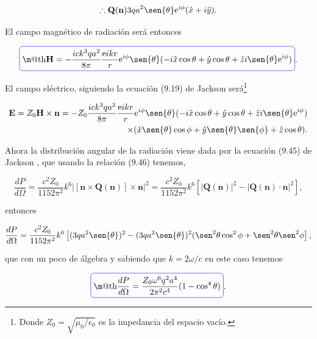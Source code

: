 \documentclass[a4paper,11pt]{article}
\makeatletter
\numberwithin{equation}{section}
\newcommand*{\boxcolor}{blue}
\renewcommand{\boxed}[1]{\textcolor{\boxcolor}{%
\tikz[baseline={([yshift=-1ex]current bounding box.center)}] \node [rectangle, minimum width=1ex,rounded corners,draw] {\normalcolor\m@th$\displaystyle#1$};}}
\newcommand{\euler}{\mathrm{e}}
\makeatother
\begin{document}
\begin{equation}
 \therefore \mathbf{Q}(\mathbf{n}) 3qa^2\sen{\theta} \euler^{i\phi}(\hat{x} + 
 i\hat{y}).
\end{equation}

El campo magnético de radiación será entonces 

\begin{equation}
 \boxed{\mathbf{H} = - \frac{ick^3qa^2}{8\pi}\frac{\euler{ikr}}{r} \euler^{i\phi} 
 \sen{\theta}(-i \hat{x} \cos{\theta} + \hat{y} \cos{\theta} + \hat{z} i \sen{\theta} 
 \euler^{i\phi})}.
\end{equation}

El campo eléctrico, siguiendo la ecuación (9.19) de Jackson \cite{jackson} será\footnote{
Donde $Z_0 = \sqrt{\mu_0/\epsilon_0}$ es la impedancia del espacio vacío.}

\begin{align*}
 \mathbf{E} = Z_0 \mathbf{H} \times \mathbf{n} = - Z_0 \frac{ick^3qa^2}{8\pi}\frac{\euler{ikr}}{r} \euler^{i\phi} 
 \sen{\theta}(-i \hat{x} \cos{\theta} + \hat{y} \cos{\theta} + \hat{z} i \sen{\theta} 
 \euler^{i\phi}) \\ \times (\hat{x} \sen{\theta}\cos{\phi} + \hat{y} \sen{\theta}\sen{\phi} 
 + \hat{z} \cos{\theta}).
\end{align*}

Ahora la distribución angular de la radiación viene dada por la ecuación (9.45) de 
Jackson \cite{jackson}, que usando la relación (9.46) tenemos,

\begin{equation}
 \frac{dP}{d\Omega} = \frac{c^2 Z_0}{1152 \pi^2}k^6 |[\mathbf{n} \times 
 \mathbf{Q}(\mathbf{n})] \times \mathbf{n}|^2 = \frac{c^2 Z_0}{1152 \pi^2}k^6
 \left[|\mathbf{Q}(\mathbf{n})|^2 - |\mathbf{Q}(\mathbf{n})\cdot \mathbf{n}|^2 \right],
\end{equation}

entonces 

\begin{equation}
 \frac{dP}{d\Omega} = \frac{c^2 Z_0}{1152 \pi^2}k^6 \left[(3qa^2\sen{\theta})^2 
 - (3qa^2\sen{\theta})^2(\sen^2{\theta}\cos^2{\phi} + \sen^2{\theta}\sen^2{\phi}\right],
\end{equation}

que con un poco de álgebra y sabiendo que $k=2\omega/c$ en este caso tenemos 

\begin{equation}
 \boxed{\frac{dP}{d\Omega} = \frac{Z_0\omega^6 q^2 a^4}{2\pi^2 c^4}(1 - \cos^4{\theta})}.
\end{equation}
\end{document}
